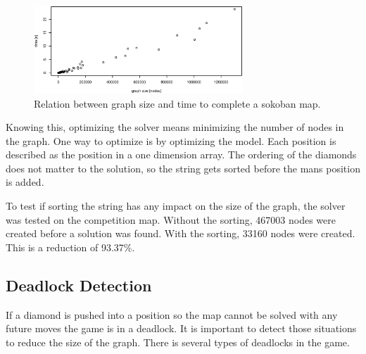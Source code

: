 \begin{figure}[h]
\centering
 \includegraphics[width=0.7\textwidth]{img/time_vs_graph_size}
 \caption{Relation between graph size and time to complete a sokoban map.}
 \label{fig:time_vs_graph_size}
\end{figure}

Knowing this, optimizing the solver means minimizing the number of nodes in the graph.
One way to optimize is by optimizing the model.
Each position is described as the position in a one dimension array.
The ordering of the diamonds does not matter to the solution, so the string gets sorted before the mans position is added.

To test if sorting the string has any impact on the size of the graph, the solver was tested on the competition map.
Without the sorting, 467003 nodes were created before a solution was found.
With the sorting, 33160 nodes were created. 
This is a reduction of 93.37\%.

\subsection{Deadlock Detection}
If a diamond is pushed into a position so the map cannot be solved with any future moves the game is in a deadlock.
It is important to detect those situations to reduce the size of the graph.
There is several types of deadlocks in the game.

